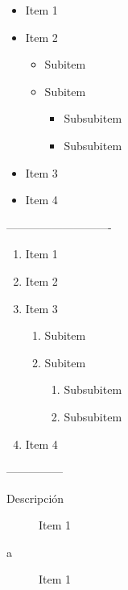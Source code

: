 \documentclass{article}
\begin{document}
\begin{itemize}
  \item Item 1
  \item Item 2 
    \begin{itemize}
      \item Subitem
      \item Subitem
        \begin{itemize}
          \item Subsubitem
          \item Subsubitem
        \end{itemize}
    \end{itemize}
  \item Item 3
  \item Item 4
\end{itemize}

----------------------------
\begin{enumerate}
  \item Item 1
  \item Item 2
  \item Item 3
    \begin{enumerate}
      \item Subitem
      \item Subitem
        \begin{enumerate}
          \item Subsubitem
          \item Subsubitem
        \end{enumerate}
    \end{enumerate}
  \item Item 4
\end{enumerate}


---------------
\begin{description}
  \item[Descripción] Item 1
  \item[a] Item 1
\end{description}
\end{document}
